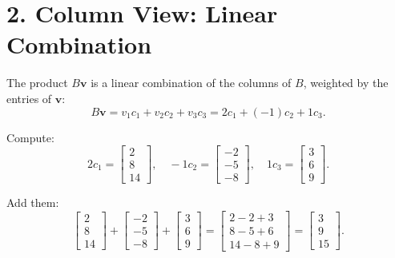 \section*{2. Column View: Linear Combination}

The product $ B\mathbf{v} $ is a linear combination of the columns of $ B $, weighted by the entries of $ \mathbf{v} $:
\[
B\mathbf{v} = v_1 c_1 + v_2 c_2 + v_3 c_3 = 2 c_1 + (-1) c_2 + 1 c_3.
\]

Compute:
\[
2 c_1 = \begin{bmatrix} 2 \\ 8 \\ 14 \end{bmatrix}, \quad
-1 c_2 = \begin{bmatrix} -2 \\ -5 \\ -8 \end{bmatrix}, \quad
1 c_3 = \begin{bmatrix} 3 \\ 6 \\ 9 \end{bmatrix}.
\]

Add them:
\[
\begin{bmatrix} 2 \\ 8 \\ 14 \end{bmatrix}
+
\begin{bmatrix} -2 \\ -5 \\ -8 \end{bmatrix}
+
\begin{bmatrix} 3 \\ 6 \\ 9 \end{bmatrix}
=
\begin{bmatrix}
2 - 2 + 3 \\
8 - 5 + 6 \\
14 - 8 + 9
\end{bmatrix}
=
\begin{bmatrix}
3 \\ 9 \\ 15
\end{bmatrix}.
\]

